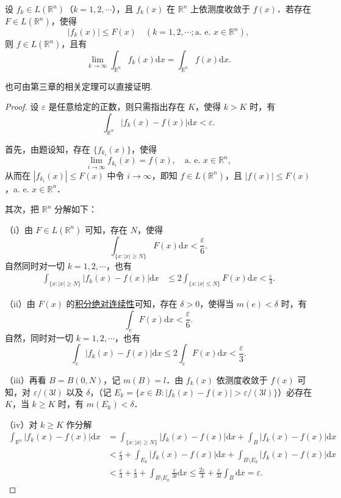 \documentclass[../../main.tex]{subfiles}%
\begin{document}
\begin{theorem}[依测度收敛型控制收敛定理]\label{theorem:依测度收敛型控制收敛定理}
设 \( f_k \in L(\mathbb{R}^n) \)（\( k = 1,2,\cdots \)），且 \( f_k(x) \) 在 \( \mathbb{R}^n \) 上依测度收敛于 \( f(x) \)．若存在 \( F \in L(\mathbb{R}^n) \)，使得
\[
|f_k(x)| \leqslant F(x) \quad (k = 1,2,\cdots; \text{a. e. } x \in \mathbb{R}^n),
\]
则 \( f \in L(\mathbb{R}^n) \)，且有
\[
\lim_{k \to \infty} \int_{\mathbb{R}^n} f_k(x) \mathrm{d}x = \int_{\mathbb{R}^n} f(x) \mathrm{d}x.
\]
\end{theorem}
\begin{remark}
也可由第三章的相关定理可以直接证明.
\end{remark}
\begin{proof}

设 \( \varepsilon \) 是任意给定的正数，则只需指出存在 \( K \)，使得 \( k > K \) 时，有
\[
\int_{\mathbb{R}^n} |f_k(x) - f(x)| \mathrm{d}x < \varepsilon.
\]

首先，由题设知，存在 \( \{ f_{k_i}(x) \} \)，使得
\[
\lim_{i \to \infty} f_{k_i}(x) = f(x), \quad \text{a. e. } x \in \mathbb{R}^n,
\]
从而在 \( |f_{k_i}(x)| \leqslant F(x) \) 中令 \( i \to \infty \)，即知 \( f \in L(\mathbb{R}^n) \)，且 \( |f(x)| \leqslant F(x) \)，a. e. \( x \in \mathbb{R}^n \)．

其次，把 \( \mathbb{R}^n \) 分解如下：

（i）由 \( F \in L(\mathbb{R}^n) \) 可知，存在 \( N \)，使得
\[
\int_{\{ x : |x| \geqslant N \}} F(x) \mathrm{d}x < \frac{\varepsilon}{6}.
\]
自然同时对一切 \( k = 1,2,\cdots \)，也有
\begin{align*}
\int_{\{ x : |x| \geqslant N \}} |f_k(x) - f(x)| \mathrm{d}x &\leqslant 2 \int_{\{ x : |x| \leqslant N \}} F(x) \mathrm{d}x < \frac{\varepsilon}{3}.
\end{align*}

（ii）由 \( F(x) \) 的\hyperref[theorem:积分的绝对连续性]{积分绝对连续性}可知，存在 \( \delta > 0 \)，使得当 \( m(e) < \delta \) 时，有
\[
\int_{e} F(x) \mathrm{d}x < \frac{\varepsilon}{6}.
\]
自然，同时对一切 \( k = 1,2,\cdots \)，也有
\[
\int_{e} |f_k(x) - f(x)| \mathrm{d}x \leqslant 2 \int_{e} F(x) \mathrm{d}x < \frac{\varepsilon}{3}.
\]

（iii）再看 \( B = B(0, N) \)，记 \( m(B) = l \)．由 \( f_k(x) \) 依测度收敛于 \( f(x) \) 可知，对 \( \varepsilon/(3l) \) 以及 \( \delta \)，（记 \( E_k = \{ x \in B : |f_k(x) - f(x)| > \varepsilon/(3l) \} \)）必存在 \( K \)，当 \( k \geqslant K \) 时，有 \( m(E_k) < \delta \)．

（iv）对 \( k \geqslant K \) 作分解
\begin{align*}
\int_{\mathbb{R}^n} |f_k(x) - f(x)| \mathrm{d}x &= \int_{\{ x : |x| \geqslant N \}} |f_k(x) - f(x)| \mathrm{d}x + \int_{B} |f_k(x) - f(x)| \mathrm{d}x \\
&< \frac{\varepsilon}{3} + \int_{E_k} |f_k(x) - f(x)| \mathrm{d}x + \int_{B \setminus E_k} |f_k(x) - f(x)| \mathrm{d}x \\
&< \frac{\varepsilon}{3} + \frac{\varepsilon}{3} + \int_{B \setminus E_k} \frac{\varepsilon}{3l} \mathrm{d}x \leqslant \frac{2\varepsilon}{3} + \frac{\varepsilon}{3l} \int_{B} \mathrm{d}x = \varepsilon.
\end{align*}
\end{proof}
\end{document}
